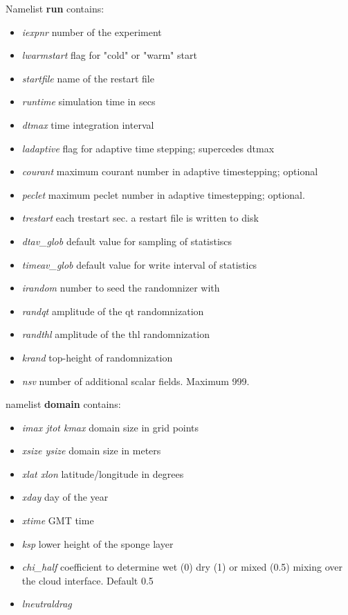 \documentclass[a4paper,10pt]{article}
\begin{document}
Namelist \textbf{run} contains:
\begin{itemize}
 \item \textit{iexpnr} number of the experiment
\item \textit{lwarmstart}  flag for "cold"  or "warm" start
\item \textit{startfile} name of the restart file
\item \textit{runtime} simulation time in secs
\item \textit{dtmax} time integration interval
\item \textit{ladaptive} flag for adaptive time stepping; supercedes dtmax
\item \textit{courant} maximum courant number in adaptive timestepping; optional
\item \textit{peclet} maximum peclet number in adaptive timestepping; optional.
\item \textit{trestart} each trestart sec. a restart file is written to disk
\item \textit{dtav\_glob} default value for sampling of statistiscs
\item \textit{timeav\_glob} default value for write interval of statistics
\item \textit{irandom} number to seed the randomnizer with
\item \textit{randqt} amplitude of the qt randomnization
\item \textit{randthl} amplitude of the thl randomnization
\item \textit{krand} top-height of randomnization
\item \textit{nsv} number of additional scalar fields. Maximum 999.
\end{itemize}
namelist \textbf{domain} contains:
\begin{itemize}
 \item \textit{imax jtot kmax} domain size in grid points
\item \textit{xsize ysize} domain size in meters
\item \textit{xlat xlon} latitude/longitude in degrees
\item \textit{xday} day of the year
\item \textit{xtime} GMT time
\item \textit{ksp} lower height of the sponge layer
\item \textit{chi\_half} coefficient to determine wet (0) dry (1) or mixed (0.5) mixing over the cloud interface. Default 0.5
\item \textit{lneutraldrag}
\end{itemize}
\end{document}
